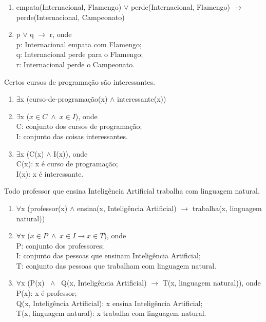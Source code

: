 \begin{enumerate}[label=(\roman*)]
    \item empata(Internacional, Flamengo) $\lor$ perde(Internacional, Flamengo) $\to$ perde(Internacional, Campeonato)
    \item p $\lor$ q $\to$ r, onde\\
    p: Internacional empata com Flamengo;\\
    q: Internacional perde para o Flamengo;\\
    r: Internacional perde o Campeonato.
\end{enumerate}

\bigskip
\begin{exemplo} Certos cursos de programação são interessantes.
\end{exemplo}

\begin{enumerate}[label=(\roman*)]
    \item $\exists$x (curso-de-programação(x) $\land$ interessante(x))
    \item $\exists$x ($x \in C \; \land \; x \in I$), onde\\
    C: conjunto dos cursos de programação;\\
    I: conjunto das coisas interessantes.
    \item $\exists$x (C(x) $\land$ I(x)), onde\\
    C(x): x é curso de programação;\\
    I(x): x é interessante.
\end{enumerate}

\bigskip
\begin{exemplo} Todo professor que ensina Inteligência Artificial trabalha com linguagem natural.
\end{exemplo}

\begin{enumerate}[label=(\roman*)]
    \item $\forall$x (professor(x) $\land$ ensina(x, Inteligência Artificial) $\to$ trabalha(x, linguagem natural))
    \item $\forall$x ($x \in P \; \land \; x \in I \to x \in T$), onde\\
    P: conjunto dos professores;\\
    I: conjunto das pessoas que ensinam Inteligência Artificial;\\
    T: conjunto das pessoas que trabalham com linguagem natural.
    \item $\forall$x (P(x) $\; \land \;$ Q(x, Inteligência Artificial) $\to$ T(x, linguagem natural)), onde\\
    P(x): x é professor;\\
    Q(x, Inteligência Artificial): x ensina Inteligência Artificial;\\
    T(x, linguagem natural): x trabalha com linguagem natural.
\end{enumerate}

